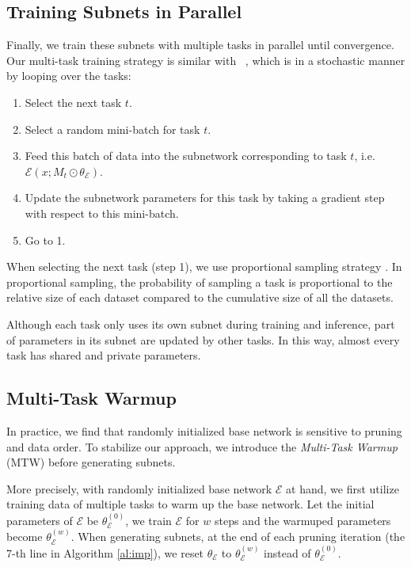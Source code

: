 \documentclass[letterpaper]{article} %
\newcommand{\citet}[1]{\citeauthor{#1}~\shortcite{#1}}
\begin{document}
\subsection{Training Subnets in Parallel}
Finally, we train these subnets with multiple tasks in parallel until convergence. Our multi-task training strategy is similar with \citet{DBLP:conf/icml/CollobertW08}, which is in a stochastic manner by looping over the tasks:
\begin{enumerate}
    \item Select the next task $t$.
    \item Select a random mini-batch for task $t$.
    \item Feed this batch of data into the subnetwork corresponding to task $t$, i.e. $\mathcal{E}(x;M_t\odot\theta_\mathcal{E})$.
    \item Update the subnetwork parameters for this task by taking a gradient step with respect to this mini-batch.
    \item Go to 1.
\end{enumerate}

 When selecting the next task (step 1), we use proportional sampling strategy \cite{DBLP:conf/aaai/SanhWR19}. In proportional sampling, the probability of sampling a task is proportional to the relative size of each dataset compared to the cumulative size of all the datasets.

Although each task only uses its own subnet during training and inference, part of parameters in its subnet are updated by other tasks. In this way, almost every task has shared and private parameters.

\subsection{Multi-Task Warmup}
In practice, we find that randomly initialized base network is sensitive to pruning and data order. To stabilize our approach, we introduce the \emph{Multi-Task Warmup} (MTW) before generating subnets.

More precisely, with randomly initialized base network $\mathcal{E}$ at hand, we first utilize training data of multiple tasks to warm up the base network. Let the initial parameters of $\mathcal{E}$ be $\theta_\mathcal{E}^{(0)}$, we train $\mathcal{E}$ for $w$ steps and the warmuped parameters become $\theta_\mathcal{E}^{(w)}$. When generating subnets, at the end of each pruning iteration (the 7-th line in Algorithm \ref{al:imp}), we reset $\theta_\mathcal{E}$ to $\theta_\mathcal{E}^{(w)}$ instead of $\theta_\mathcal{E}^{(0)}$.
\end{document}
